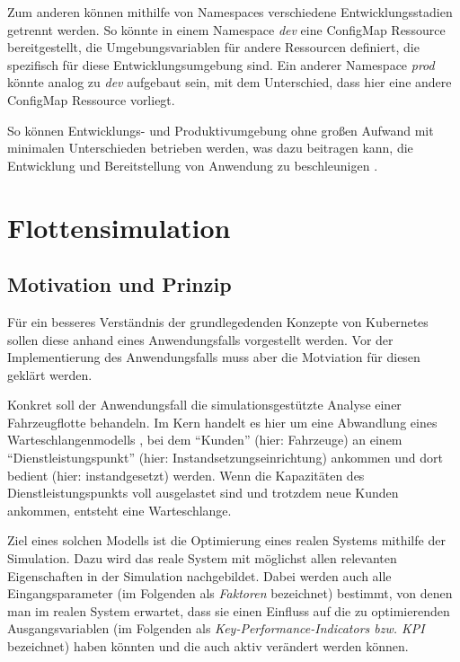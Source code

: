 \documentclass[11pt,a4paper]{article}
\begin{document}
Zum anderen können mithilfe von Namespaces verschiedene Entwicklungsstadien getrennt werden.
So könnte in einem Namespace \emph{dev} eine ConfigMap Ressource bereitgestellt,
die Umgebungsvariablen für andere Ressourcen definiert, die spezifisch für diese 
Entwicklungsumgebung sind. Ein anderer Namespace \emph{prod} könnte analog zu \emph{dev}
aufgebaut sein, mit dem Unterschied, dass hier eine andere ConfigMap Ressource vorliegt.

So können Entwicklungs- und Produktivumgebung ohne großen Aufwand mit minimalen Unterschieden betrieben
werden, was dazu beitragen kann, die Entwicklung und Bereitstellung von Anwendung zu beschleunigen
\cite{Schmeling_Dargatz_2022}.

\section{Flottensimulation}

\subsection{Motivation und Prinzip}
Für ein besseres Verständnis der grundlegedenden Konzepte von Kubernetes sollen diese anhand eines
Anwendungsfalls vorgestellt werden.
Vor der Implementierung des Anwendungsfalls muss aber die Motviation für diesen geklärt werden.

Konkret soll der Anwendungsfall die simulationsgestützte Analyse einer Fahrzeugflotte behandeln.
Im Kern handelt es hier um eine Abwandlung eines Warteschlangenmodells \cite{Leonelli2021}, bei dem
``Kunden'' (hier: Fahrzeuge) an einem ``Dienstleistungspunkt'' (hier: Instandsetzungseinrichtung) ankommen 
und dort bedient (hier: instandgesetzt) werden.
Wenn die Kapazitäten des Dienstleistungspunkts voll ausgelastet sind und trotzdem neue Kunden ankommen, entsteht eine Warteschlange.

Ziel eines solchen Modells ist die Optimierung eines realen Systems mithilfe der Simulation.
Dazu wird das reale System mit möglichst allen relevanten Eigenschaften in der Simulation nachgebildet.
Dabei werden auch alle Eingangsparameter (im Folgenden als \emph{Faktoren} bezeichnet) bestimmt, 
von denen man im realen System erwartet, dass sie einen Einfluss auf die zu optimierenden
Ausgangsvariablen (im Folgenden als \emph{Key-Performance-Indicators bzw. KPI} bezeichnet)
haben könnten und die auch aktiv verändert werden können.
\end{document}

